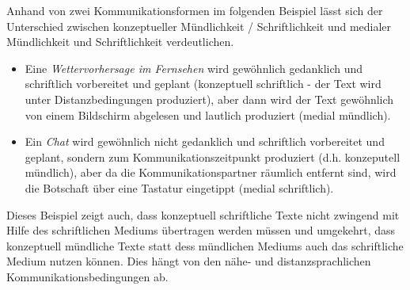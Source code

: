\documentclass[
  letterpaper,
]{scrbook}
\begin{document}
Anhand von zwei Kommunikationsformen im folgenden Beispiel lässt sich
der Unterschied zwischen konzeptueller Mündlichkeit / Schriftlichkeit
und medialer Mündlichkeit und Schriftlichkeit verdeutlichen.

\begin{itemize}
\item
  Eine \emph{Wettervorhersage im Fernsehen} wird gewöhnlich gedanklich
  und schriftlich vorbereitet und geplant (konzeptuell schriftlich - der
  Text wird unter Distanzbedingungen produziert), aber dann wird der
  Text gewöhnlich von einem Bildschirm abgelesen und lautlich produziert
  (medial mündlich).
\item
  Ein \emph{Chat} wird gewöhnlich nicht gedanklich und schriftlich
  vorbereitet und geplant, sondern zum Kommunikationszeitpunkt
  produziert (d.h. konzeputell mündlich), aber da die
  Kommunikationspartner räumlich entfernt sind, wird die Botschaft über
  eine Tastatur eingetippt (medial schriftlich).
\end{itemize}

Dieses Beispiel zeigt auch, dass konzeptuell schriftliche Texte nicht
zwingend mit Hilfe des schriftlichen Mediums übertragen werden müssen
und umgekehrt, dass konzeptuell mündliche Texte statt dess mündlichen
Mediums auch das schriftliche Medium nutzen können. Dies hängt von den
nähe- und distanzsprachlichen Kommunikationsbedingungen ab.
\end{document}
